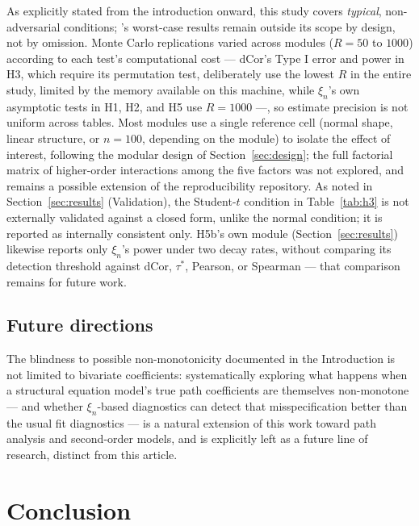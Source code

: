 \documentclass[article]{ajs}
\begin{document}
As explicitly stated from the introduction onward, this study covers
\emph{typical}, non-adversarial conditions; \citet{bucher2025}'s
worst-case results remain outside its scope by design, not by
omission. Monte Carlo replications varied across modules ($R=50$ to
$1000$) according to each test's computational cost --- dCor's Type I
error and power in H3, which require its permutation test,
deliberately use the lowest $R$ in the entire study, limited by the
memory available on this machine, while $\xi_n$'s own asymptotic tests
in H1, H2, and H5 use $R=1000$ ---, so estimate precision is not
uniform across tables. Most modules use a single reference cell
(normal shape, linear structure, or $n=100$, depending on the module)
to isolate the effect of interest, following the modular design of
Section~\ref{sec:design}; the full factorial matrix of higher-order
interactions among the five factors was not explored, and remains a
possible extension of the reproducibility repository. As noted in
Section~\ref{sec:results} (Validation), the Student-$t$ condition in
Table~\ref{tab:h3} is not externally validated against a closed form,
unlike the normal condition; it is reported as internally consistent
only. H5b's own module (Section~\ref{sec:results}) likewise reports
only $\xi_n$'s power under two decay rates, without comparing its
detection threshold against dCor, $\tau^\ast$, Pearson, or Spearman ---
that comparison remains for future work.

\subsection{Future directions}

The blindness to possible non-monotonicity documented in the
Introduction is not limited to bivariate coefficients: systematically
exploring what happens when a structural equation model's true path
coefficients are themselves non-monotone --- and whether $\xi_n$-based
diagnostics can detect that misspecification better than the usual
fit diagnostics --- is a natural extension of this work toward path
analysis and second-order models, and is explicitly left as a future
line of research, distinct from this article.

\section{Conclusion} \label{sec:conclusion}
\end{document}
